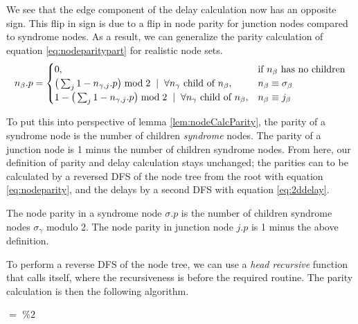 We see that the edge component of the delay calculation now has an opposite sign. This flip in sign is due to a flip in node parity for junction nodes compared to syndrome nodes. As a result, we can generalize the parity calculation of equation \ref{eq:nodeparitypart} for realistic node sets.
\begin{equation}\label{eq:nodeparity}
  n_\beta.p =
  \begin{cases}
    0, & \mbox{if $n_\beta$ has no children}  \\
    \big( \sum_{j} 1-n_{\gamma,j}.p \big ) \bmod 2 \hspace{.2cm} | \hspace{.2cm} \forall n_\gamma \mbox{ child of } n_\beta, & n_\beta \equiv \sigma_\beta \\
    1 - \big( \sum_{j} 1-n_{\gamma,j}.p \big ) \bmod 2 \hspace{.2cm} | \hspace{.2cm} \forall n_\gamma \mbox{ child of } n_\beta, & n_\beta \equiv j_\beta
  \end{cases}
\end{equation}

To put this into perspective of lemma \ref{lem:nodeCalcParity}, the parity of a syndrome node is the number of children \emph{syndrome} nodes. The parity of a junction node is 1 minus the number of children syndrome nodes. From here, our definition of parity and delay calculation stays unchanged; the parities can to be calculated by a reversed DFS of the node tree from the root with equation \ref{eq:nodeparity}, and the delays by a second DFS with equation \ref{eq:2ddelay}.

\begin{lemma}\label{lem:nodecalc_junction}
  The node parity in a syndrome node $\sigma.p$ is the number of children syndrome nodes $\sigma_\gamma$ modulo 2. The node parity in junction node $j.p$ is 1 minus the above definition.
\end{lemma}

To perform a reverse DFS of the node tree, we can use a \emph{head recursive} function that calls itself, where the recursiveness is before the required routine. The parity calculation is then the following algorithm.
\begin{algo}[algotitle=CalcParity, label=al:calcparity]
\begin{algorithm}[H]

\KwData{\node}

\BlankLine

\parity $=$  $\%2$\;
\end{algorithm}
\end{algo}


